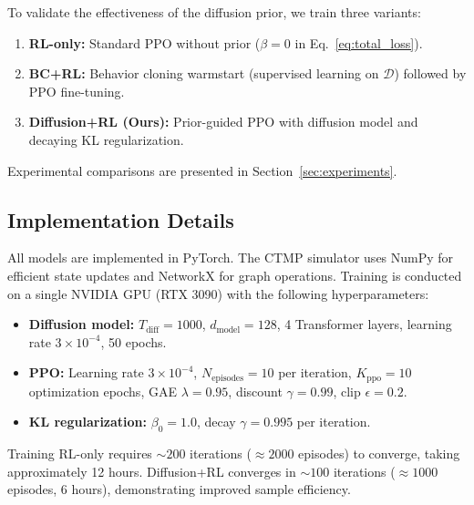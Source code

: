To validate the effectiveness of the diffusion prior, we train three variants:
\begin{enumerate}
    \item \textbf{RL-only:} Standard PPO without prior ($\beta=0$ in Eq.~\ref{eq:total_loss}).
    \item \textbf{BC+RL:} Behavior cloning warmstart (supervised learning on $\mathcal{D}$)
    followed by PPO fine-tuning.
    \item \textbf{Diffusion+RL (Ours):} Prior-guided PPO with diffusion model and
    decaying KL regularization.
\end{enumerate}
Experimental comparisons are presented in Section~\ref{sec:experiments}.


\subsection{Implementation Details}
\label{sec:implementation}

All models are implemented in PyTorch. The CTMP simulator uses NumPy for efficient
state updates and NetworkX for graph operations. Training is conducted on a single
NVIDIA GPU (RTX 3090) with the following hyperparameters:

\begin{itemize}
    \item \textbf{Diffusion model:} $T_{\text{diff}}=1000$, $d_{\text{model}}=128$,
    4 Transformer layers, learning rate $3 \times 10^{-4}$, 50 epochs.
    \item \textbf{PPO:} Learning rate $3 \times 10^{-4}$, $N_{\text{episodes}}=10$
    per iteration, $K_{\text{ppo}}=10$ optimization epochs, GAE $\lambda=0.95$,
    discount $\gamma=0.99$, clip $\epsilon=0.2$.
    \item \textbf{KL regularization:} $\beta_0=1.0$, decay $\gamma=0.995$ per iteration.
\end{itemize}

Training RL-only requires $\sim 200$ iterations ($\approx 2000$ episodes) to converge,
taking approximately 12 hours. Diffusion+RL converges in $\sim 100$ iterations
($\approx 1000$ episodes, 6 hours), demonstrating improved sample efficiency.

